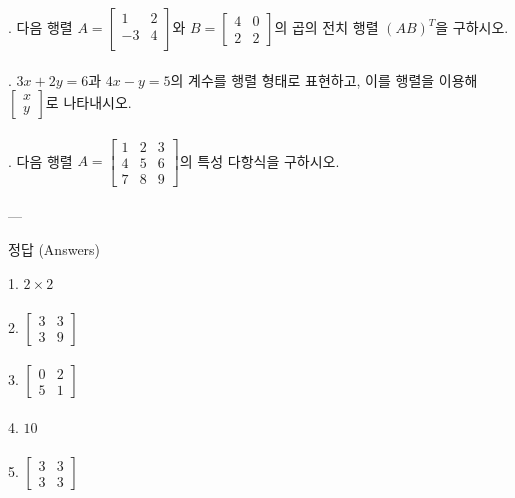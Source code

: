 \documentclass[fleqn]{article}
\begin{document}
. 다음 행렬 \( A = \begin{bmatrix} 1 & 2 \\ -3 & 4 \\ \end{bmatrix} \)와 \( B = \begin{bmatrix} 4 & 0 \\ 2 & 2 \end{bmatrix} \)의 곱의 전치 행렬 \((AB)^T\)을 구하시오. \\\\

. \( 3x + 2y = 6 \)과 \( 4x - y = 5 \)의 계수를 행렬 형태로 표현하고, 이를 행렬을 이용해 \( \begin{bmatrix} x \\ y \end{bmatrix} \)로 나타내시오. \\\\

. 다음 행렬 \( A = \begin{bmatrix} 1 & 2 & 3 \\ 4 & 5 & 6 \\ 7 & 8 & 9 \end{bmatrix} \)의 특성 다항식을 구하시오. \\\\

---

 정답 (Answers)

1. \( 2 \times 2 \) \\\\

2. \( \begin{bmatrix} 3 & 3 \\ 3 & 9 \end{bmatrix} \) \\\\

3. \( \begin{bmatrix} 0 & 2 \\ 5 & 1 \end{bmatrix} \) \\\\

4. \( 10 \) \\\\

5. \( \begin{bmatrix} 3 & 3 \\ 3 & 3 \end{bmatrix} \) \\\\
\end{document}
